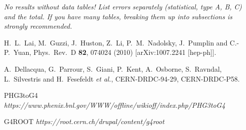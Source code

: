 \documentclass[12pt]{article}
\begin{document}
{\it
  No results without data tables!  List errors separately
  (statistical, type A, B, C) and the total.  If you have many tables,
  breaking them up into subsections is strongly recommended.
}


\begin{thebibliography}{9}

  H.~L.~Lai, M.~Guzzi, J.~Huston, Z.~Li, P.~M.~Nadolsky, J.~Pumplin and C.-P.~Yuan,
  Phys.\ Rev.\ D {\bf 82}, 074024 (2010)
  [arXiv:1007.2241 [hep-ph]].


  A.~Dellacqua, G.~Parrour, S.~Giani, P.~Kent, A.~Osborne, S.~Ravndal, L.~Silvestris and H.~Fesefeldt {\it et al.},
  CERN-DRDC-94-29, CERN-DRDC-P58.

 PHG3toG4
   {\it https://www.phenix.bnl.gov/WWW/offline/wikioff/index.php/PHG3toG4 }

 G4ROOT
   {\it https://root.cern.ch/drupal/content/g4root}


\end{thebibliography}
\end{document}
